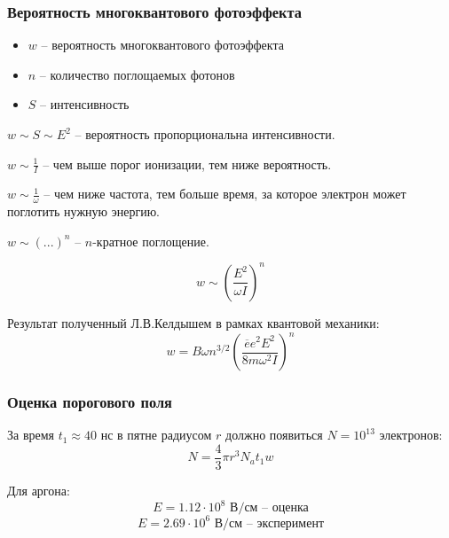 \documentclass{beamer}
\begin{document}
	\begin{frame}
		\frametitle{Вероятность многоквантового фотоэффекта}
		\begin{itemize}
			\setlength\itemsep{-2pt}
			\item $w$ -- вероятность многоквантового фотоэффекта
			\item $n$ -- количество поглощаемых фотонов
			\item $S$ -- интенсивность
		\end{itemize}
		
		$w \sim S \sim E^2$ -- вероятность пропорциональна интенсивности.
		
		$w \sim \frac{1}{I}$ -- чем выше порог ионизации, тем ниже вероятность.
		
		$w \sim \frac{1}{\omega}$ -- чем ниже частота, тем больше время, за которое электрон может поглотить нужную энергию.

		$w \sim (...)^n$ -- $n$-кратное поглощение.
		
		$$ w \sim \left(\frac{E^2}{\omega I}\right)^n$$
		
		Результат полученный Л.В.Келдышем в рамках квантовой механики:
		\begin{equation}
			w = B \omega n^{3/2} \left(\frac{\overline{e} e^2 E^2}{8m \omega^2 I}\right)^n
		\end{equation}
		
	\end{frame}
	
	\begin{frame}
		\frametitle{Оценка порогового поля}
		
		За время $t_1 \approx 40 \text{ нс}$ в пятне радиусом $r$ должно появиться $N = 10^{13}$ электронов:
		$$N = \frac{4}{3} \pi r^3 N_a t_1 w$$
		\begin{center}
			\boxed{E = \sqrt{\frac{8m\omega^2 I}{\overline{e} e^2}} \left[\frac{w}{\omega n^{3/2}}\right]^{1/2n}}
		\end{center}
	
		Для аргона:
		$$ E = 1.12 \cdot 10^8 \text{ В/см -- оценка}$$
		$$ E = 2.69 \cdot 10^6 \text{ В/см -- эксперимент}$$
		
	\end{frame}
	
\end{document}
